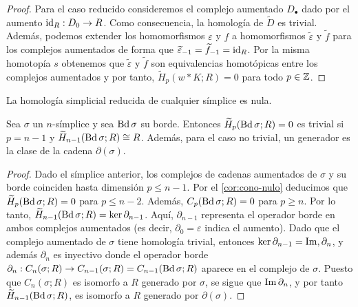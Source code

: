 \begin{proof}
	Para el caso reducido consideremos el complejo aumentado $D_{\bullet}$ dado por el aumento $\operatorname{id}_R : D_0 \to R$. Como consecuencia, la homología de $\widetilde{D}$ es trivial. Además, podemos extender los homomorfismos $\varepsilon$ y $f$ a homomorfismos $\widetilde{\varepsilon}$ y $\widetilde{f}$ para los complejos aumentados de forma que $\widetilde{\varepsilon}_{-1} = \widetilde{f}_{-1} = \operatorname{id}_R$. Por la misma homotopía $s$ obtenemos que $\widetilde{\varepsilon}$ y $\widetilde{f}$ son equivalencias homotópicas entre los complejos aumentados y por tanto, $\widetilde{H}_p(w \ast K;R) = 0$ para todo $p \in \mathbb{Z}$.
\end{proof}
\begin{corolario}
	\label{cor:cono-nulo}
	La homología simplicial reducida de cualquier símplice es nula.
\end{corolario}
\begin{corolario}
	Sea $\sigma$ un $n$-símplice y sea $\operatorname{Bd} \sigma$ su borde. Entonces $\widetilde{H}_p(\operatorname{Bd} \sigma;R) = 0$ es trivial si $p = n-1$ y $\widetilde{H}_{n-1}(\operatorname{Bd} \sigma; R) \cong R$. Además, para el caso no trivial, un generador es la clase de la cadena $\partial(\sigma)$.
\end{corolario}
\begin{proof}
	Dado el símplice anterior, los complejos de cadenas aumentados de $\sigma$ y su borde coinciden hasta dimensión $p \leq n-1$. Por el \autoref{cor:cono-nulo} deducimos que $\widetilde{H}_p(\operatorname{Bd} \sigma; R) = 0$ para $p \leq n-2$. Además, $C_p(\operatorname{Bd} \sigma; R) = 0$ para $p \geq n$. Por lo tanto, $\widetilde{H}_{n-1}(\operatorname{Bd}\sigma;R)=\ker \partial_{n-1}$. Aquí, $\partial_{n-1}$ representa el operador borde en ambos complejos aumentados (es decir, $\partial_{0}=\varepsilon$ indica el aumento). Dado que el complejo aumentado de $\sigma$ tiene homología trivial, entonces $\ker \partial_{n-1}=\operatorname{Im}, \partial_{n}$, y además $\partial_{n}$ es inyectivo donde el operador borde $\partial_n: C_n(\sigma; R) \rightarrow C_{n-1}(\sigma; R) = C_{n-1}(\operatorname{Bd} \sigma; R)$ aparece en el complejo de $\sigma$. Puesto que $C_n(\sigma;R)$ es isomorfo a $R$ generado por $\sigma$, se sigue que $\operatorname{Im} \partial_n$, y por tanto $\widetilde{H}_{n-1}(\operatorname{Bd}\sigma;R)$, es isomorfo a $R$ generado por $\partial(\sigma)$.
\end{proof}

